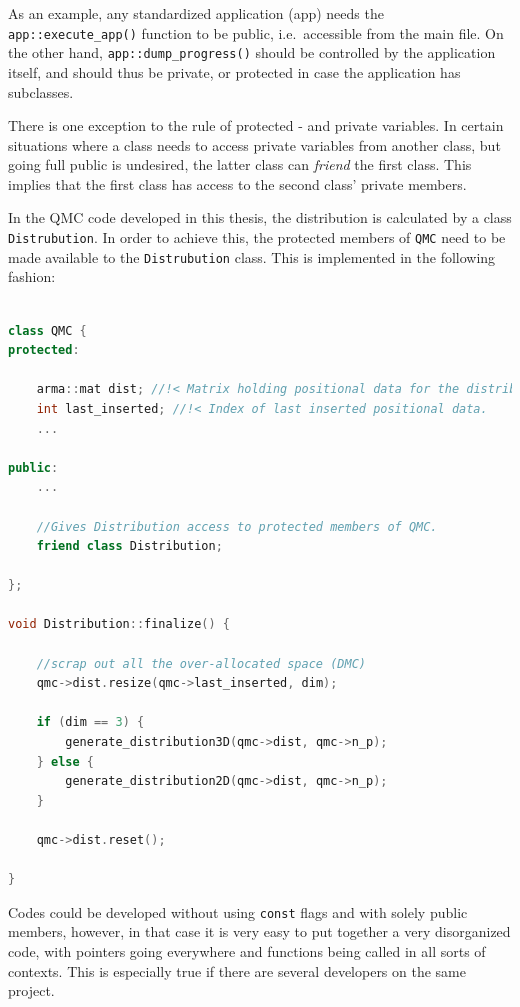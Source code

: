 As an example, any standardized application (app) needs the \verb+app::execute_app()+ function to be public, i.e.~accessible from the main file. On the other hand, \verb+app::dump_progress()+ should be controlled by the application itself, and should thus be private, or protected in case the application has subclasses.

There is one exception to the rule of protected - and private variables. In certain situations where a class needs to access private variables from another class, but going full public is undesired, the latter class can \textit{friend} the first class. This implies that the first class has access to the second class' private members.

In the QMC code developed in this thesis, the distribution is calculated by a class \verb+Distrubution+. In order to achieve this, the protected members of \verb+QMC+ need to be made available to the \verb+Distrubution+ class. This is implemented in the following fashion:

\clearpage
\begin{lstlisting}[language=c++, caption={An example from the QMC code. The distribution class needs access to the private members of QMC. This is achieved in line 13 by friending the distribution class.}]

class QMC {
protected:
    
    arma::mat dist; //!< Matrix holding positional data for the distribution.
    int last_inserted; //!< Index of last inserted positional data.
    ...

public:
    ...

    //Gives Distribution access to protected members of QMC.
    friend class Distribution;

};

void Distribution::finalize() {

    //scrap out all the over-allocated space (DMC)
    qmc->dist.resize(qmc->last_inserted, dim);

    if (dim == 3) {
        generate_distribution3D(qmc->dist, qmc->n_p);
    } else {
        generate_distribution2D(qmc->dist, qmc->n_p);
    }

    qmc->dist.reset();

}
\end{lstlisting}

Codes could be developed without using \verb+const+ flags and with solely public members, however, in that case it is very easy to put together a very disorganized code, with pointers going everywhere and functions being called in all sorts of contexts. This is especially true if there are several developers on the same project. 

